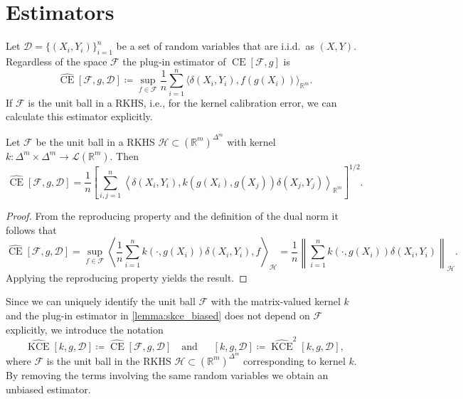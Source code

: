 \documentclass{article}
\DeclareMathOperator{\measure}{CE}
\DeclareMathOperator{\kernelmeasure}{KCE}
\DeclareMathOperator{\biasedestimator}{\widehat{SKCE}_b}
\begin{document}
\section{Estimators}

Let $\mathcal{D} = \{(X_i, Y_i)\}_{i=1}^n$ be a set of random variables that are
i.i.d.\ as $(X,Y)$. Regardless of the space $\mathcal{F}$ the plug-in estimator
of $\measure[\mathcal{F},g]$ is
\begin{equation*}
  \widehat{\measure}[\mathcal{F},g,\mathcal{D}] \coloneqq \sup_{f \in \mathcal{F}} \frac{1}{n} \sum_{i=1}^n \langle \delta(X_i,Y_i), f(g(X_i)) \rangle_{\mathbb{R}^m}.
\end{equation*}
If $\mathcal{F}$ is the unit ball in a RKHS, i.e., for the kernel calibration
error, we can calculate this estimator explicitly.

\begin{lemma}\label{lemma:skce_biased}
  Let $\mathcal{F}$ be the unit ball in a RKHS
  $\mathcal{H} \subset {(\mathbb{R}^m)}^{\Delta^m}$ with kernel
  $k \colon \Delta^m \times \Delta^m \to \mathcal{L}(\mathbb{R}^m)$. Then
  \begin{equation*}
    \widehat{\measure}[\mathcal{F},g,\mathcal{D}] = \frac{1}{n} {\left[\sum_{i,j=1}^n \left\langle \delta(X_i, Y_i), k(g(X_i), g(X_j)) \delta(X_j, Y_j) \right\rangle_{\mathbb{R}^m} \right]}^{1/2}.
  \end{equation*}
\end{lemma}

\begin{proof}
  From the reproducing property and the definition of the dual norm it
  follows that
  \begin{equation*}
    \widehat{\measure}[\mathcal{F},g,\mathcal{D}] = \sup_{f \in \mathcal{F}} \left\langle \frac{1}{n} \sum_{i=1}^n k(\cdot, g(X_i)) \delta(X_i, Y_i), f \right\rangle_{\mathcal{H}} = \frac{1}{n} {\left\|\sum_{i=1}^n k(\cdot, g(X_i)) \delta(X_i, Y_i) \right\|}_{\mathcal{H}}.
  \end{equation*}
  Applying the reproducing property yields the result.
\end{proof}

Since we can uniquely identify the unit ball $\mathcal{F}$ with the
matrix-valued kernel $k$ and the plug-in estimator in \cref{lemma:skce_biased}
does not depend on $\mathcal{F}$ explicitly, we introduce the notation
\begin{equation*}
  \widehat{\kernelmeasure}[k, g, \mathcal{D}] \coloneqq \widehat{\measure}[\mathcal{F}, g, \mathcal{D}]
  \quad \text{and} \quad
  \biasedestimator[k, g, \mathcal{D}] \coloneqq \widehat{\kernelmeasure}^2[k, g, \mathcal{D}],
\end{equation*}
where $\mathcal{F}$ is the unit ball in the RKHS
$\mathcal{H} \subset {(\mathbb{R}^m)}^{\Delta^m}$ corresponding to kernel $k$.
By removing the terms involving the same random variables we obtain an unbiased
estimator.
\end{document}
